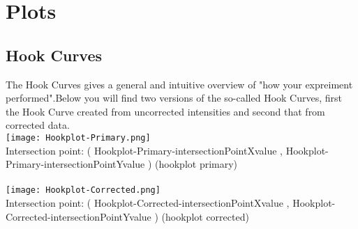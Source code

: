 \documentclass[a4paper, 10pt]{article}
\begin{document}
\section {Plots}  

\subsection*{Hook Curves}
	The Hook Curves gives a general and intuitive overview of "how your expreiment performed".Below you will find two versions of the 
	so-called Hook Curves, first the Hook Curve created from uncorrected intensities and second that from corrected data.\\
	\texttt{[image: Hookplot-Primary.png]} \\
	Intersection point: ( Hookplot-Primary-intersectionPointXvalue , Hookplot-Primary-intersectionPointYvalue ) (hookplot primary)\\ \\
	\texttt{[image: Hookplot-Corrected.png]} \\ 
	Intersection point: ( Hookplot-Corrected-intersectionPointXvalue , Hookplot-Corrected-intersectionPointYvalue ) (hookplot corrected)\\

\newpage
\end{document}
